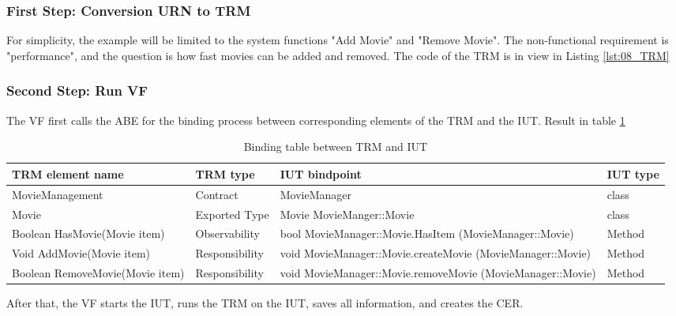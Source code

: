 \subsubsection{First Step: Conversion URN to TRM}
For simplicity, the example will be limited to the system functions "Add Movie" and "Remove Movie". The non-functional requirement is "performance", and the question is how fast movies can be added and removed. The code of the TRM is in view in Listing \ref{lst:08_TRM}



\subsubsection{Second Step: Run VF}

The VF first calls the ABE for the binding process between corresponding elements of the TRM and the IUT. Result in table \ref{tab:bindingTable}

\begin{table}[h] 
	\centering
	\begin{small}
		\caption{Binding table between TRM and IUT}
		\label{tab:bindingTable}
		\setlength{\tabcolsep}{1em}
		\begin{tabular}{>{\raggedright}p{3.5cm}| p{1.75cm}|>{\raggedright}p{5.8cm} |p{0.75cm} }
			\hline
			TRM element name & TRM type & IUT bindpoint & IUT type \\
			\hline
			\hline	
			MovieManagement & Contract & MovieManager & class\\
			\hline
			Movie & Exported Type & Movie MovieManger::Movie & class \\
			\hline
			Boolean HasMovie(Movie item) & Observability & bool MovieManager::Movie.HasItem (MovieManager::Movie) & Method \\
			\hline
			Void AddMovie(Movie item) & Responsibility & void  MovieManager::Movie.createMovie (MovieManager::Movie) & Method \\
			\hline
			Boolean RemoveMovie(Movie item) & Responsibility & void MovieManager::Movie.removeMovie (MovieManager::Movie) & Method \\
			\hline
		\end{tabular}
	\end{small}
\end{table}

After that, the VF starts the IUT, runs the TRM on the IUT, saves all information, and creates the CER.
\newpage
